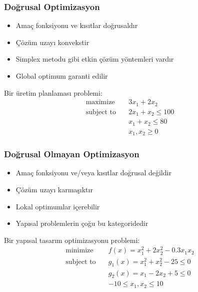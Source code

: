 \subsubsection{Doğrusal Optimizasyon}
\begin{itemize}
    \item Amaç fonksiyonu ve kısıtlar doğrusaldır
    \item Çözüm uzayı konvekstir
    \item Simplex metodu gibi etkin çözüm yöntemleri vardır
    \item Global optimum garanti edilir
\end{itemize}

\begin{tcolorbox}[title=Doğrusal Optimizasyon Örneği]
Bir üretim planlaması problemi:
\begin{equation*}
\begin{aligned}
\text{maximize} \quad & 3x_1 + 2x_2 \\
\text{subject to} \quad & 2x_1 + x_2 \leq 100 \\
& x_1 + x_2 \leq 80 \\
& x_1, x_2 \geq 0
\end{aligned}
\end{equation*}
\end{tcolorbox}

\subsubsection{Doğrusal Olmayan Optimizasyon}
\begin{itemize}
    \item Amaç fonksiyonu ve/veya kısıtlar doğrusal değildir
    \item Çözüm uzayı karmaşıktır
    \item Lokal optimumlar içerebilir
    \item Yapısal problemlerin çoğu bu kategoridedir 
\end{itemize}

\begin{tcolorbox}[title=Doğrusal Olmayan Optimizasyon Örneği]
    Bir yapısal tasarım optimizasyonu problemi:
    \begin{equation*}
    \begin{aligned}
    \text{minimize} \quad & f(x) = x_1^2 + 2x_2^2 - 0.3x_1x_2 \\
    \text{subject to} \quad & g_1(x) = x_1^2 + x_2^2 - 25 \leq 0 \\
    & g_2(x) = x_1 - 2x_2 + 5 \leq 0 \\
    & -10 \leq x_1, x_2 \leq 10
    \end{aligned}
    \end{equation*}
    \end{tcolorbox}



